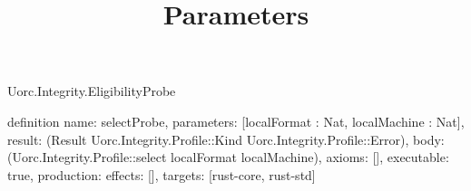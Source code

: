 \begin{lexlean}{Uorc.Integrity.EligibilityProbe}
\title{Parameters}
\begin{semanticmodule}
definition{
  name: selectProbe,
  parameters: [localFormat : Nat, localMachine : Nat],
  result: (Result Uorc.Integrity.Profile::Kind Uorc.Integrity.Profile::Error),
  body: (Uorc.Integrity.Profile::select localFormat localMachine),
  axioms: [],
  executable: true,
  production: {effects: [], targets: [rust-core, rust-std]}
}
\end{semanticmodule}
\end{lexlean}
